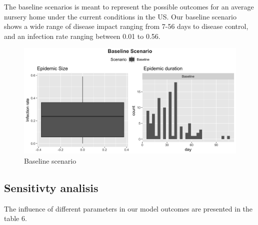 \documentclass[
]{article}
\begin{document}
The baseline scenarios is meant to represent the possible outcomes for
an average nursery home under the current conditions in the US. Our
baseline scenario shows a wide range of disease impact ranging from 7-56
days to disease control, and an infection rate ranging between 0.01 to
0.56.

\begin{figure}
\caption{Baseline scenario}
\centering
\includegraphics{Figures/SensitivityAnalysis/Baseline}
\end{figure}

\hypertarget{sensitivty-analisis}{%
\subsection{Sensitivty analisis}\label{sensitivty-analisis}}

The influence of different parameters in our model outcomes are
presented in the table 6.
\end{document}
